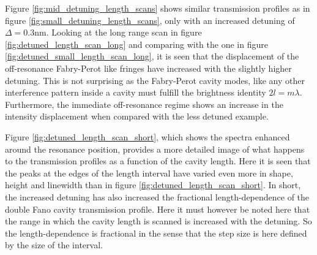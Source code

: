Figure \ref{fig:mid_detuning_length_scans} shows similar transmission profiles as in figure \ref{fig:small_detuning_length_scans}, only with an increased detuning of $\Delta = 0.3$nm. Looking at the long range scan in figure {\ref{fig:detuned_length_scan_long}} and comparing with the one in figure \ref{fig:detuned_small_length_scan_long}, it is seen that the displacement of the off-resonance Fabry-Perot like fringes have increased with the slightly higher detuning. This is not surprising as the Fabry-Perot cavity modes, like any other interference pattern inside a cavity must fulfill the brightness identity $2l = m \lambda$. Furthermore, the immediate off-resonance regime shows an increase in the intensity displacement when compared with the less detuned example. 

Figure \ref{fig:detuned_length_scan_short}, which shows the spectra enhanced around the resonance position, provides a more detailed image of what happens to the transmission profiles as a function of the cavity length. Here it is seen that the peaks at the edges of the length interval have varied even more in shape, height and linewidth than in figure \ref{fig:detuned_length_scan_short}. In short, the increased detuning has also increased the fractional length-dependence of the double Fano cavity transmission profile. Here it must however be noted here that the range in which the cavity length is scanned is increased with the detuning. So the length-dependence is fractional in the sense that the step size is here defined by the size of the interval.

